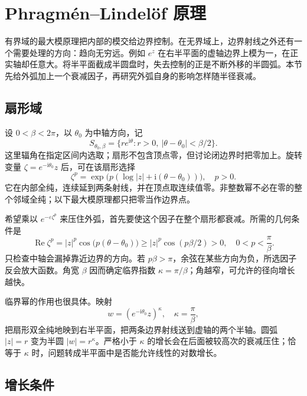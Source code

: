 \section{Phragmén–Lindelöf 原理}
\label{b3:sec:1904}

有界域的最大模原理把内部的模交给边界控制。在无界域上，边界射线之外还有一个需要处理的方向：趋向无穷远。例如 \(e^z\) 在右半平面的虚轴边界上模为一，在正实轴却任意大。将半平面截成半圆盘时，失去控制的正是不断外移的半圆弧。本节先给外弧加上一个衰减因子，再研究外弧自身的影响怎样随半径衰减。

\subsection{扇形域}
\label{b3:subsec:190401}

设 \(0<\beta<2\pi\)，以 \(\theta_0\) 为中轴方向，记
\[
 S_{\theta_0,\beta}
 =\{re^{\mathrm i\theta}:r>0,\ |\theta-\theta_0|<\beta/2\}.
\]
这里辐角在指定区间内选取；扇形不包含顶点零，但讨论闭边界时把零加上。旋转变量 \(\zeta=e^{-\mathrm i\theta_0}z\) 后，可在该扇形选择
\[
 \zeta^p=\exp\bigl(p(\log|z|+\mathrm i(\theta-\theta_0))\bigr),
 \quad p>0.
\]
它在内部全纯，连续延到两条射线，并在顶点取连续值零。非整数幂不必在零的整个邻域全纯；以下最大模原理都只把零当作边界点。

\ProseParagraphBreak

希望乘以 \(e^{-\varepsilon\zeta^p}\) 来压住外弧，首先要使这个因子在整个扇形都衰减。所需的几何条件是
\begin{equation}\label{b3:eq:19-sector-decay}
 \operatorname{Re}\zeta^p
 =|z|^p\cos\bigl(p(\theta-\theta_0)\bigr)
 \ge |z|^p\cos(p\beta/2)>0,
 \quad 0<p<\frac\pi\beta.
\end{equation}
只检查中轴会漏掉靠近边界的方向。若 \(p\beta>\pi\)，余弦在某些方向为负，所选因子反会放大函数。角宽 \(\beta\) 因而确定临界指数 \(\kappa=\pi/\beta\)；角越窄，可允许的径向增长越快。

\ProseParagraphBreak

临界幂的作用也很具体。映射
\[
 w=(e^{-\mathrm i\theta_0}z)^\kappa,
 \quad \kappa=\frac\pi\beta,
\]
把扇形双全纯地映到右半平面，把两条边界射线送到虚轴的两个半轴。圆弧 \(|z|=r\) 变为半圆 \(|w|=r^\kappa\)。严格小于 \(\kappa\) 的增长会在后面被较高次的衰减压住；恰等于 \(\kappa\) 时，问题转成半平面中是否能允许线性的对数增长。

\subsection{增长条件}
\label{b3:subsec:190402}

